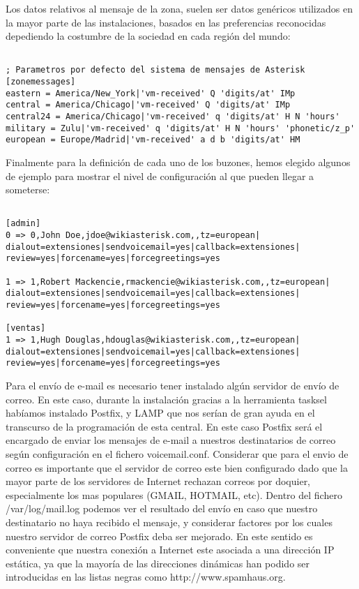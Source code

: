 Los datos relativos al mensaje de la zona, suelen ser datos genéricos utilizados en la mayor parte de las instalaciones, basados en las preferencias reconocidas depediendo la costumbre de la sociedad en cada región del mundo:

\begin{lstlisting}[style=bash,title={/etc/asterisk/voicemail.conf}]

; Parametros por defecto del sistema de mensajes de Asterisk
[zonemessages]
eastern = America/New_York|'vm-received' Q 'digits/at' IMp
central = America/Chicago|'vm-received' Q 'digits/at' IMp
central24 = America/Chicago|'vm-received' q 'digits/at' H N 'hours'
military = Zulu|'vm-received' q 'digits/at' H N 'hours' 'phonetic/z_p'
european = Europe/Madrid|'vm-received' a d b 'digits/at' HM

\end{lstlisting}

Finalmente para la definición de cada uno de los buzones, hemos elegido algunos de ejemplo para mostrar el nivel de configuración al que pueden llegar a someterse:

\begin{lstlisting}[style=bash,title={/etc/asterisk/voicemail.conf}]

[admin]
0 => 0,John Doe,jdoe@wikiasterisk.com,,tz=european|
dialout=extensiones|sendvoicemail=yes|callback=extensiones|
review=yes|forcename=yes|forcegreetings=yes

1 => 1,Robert Mackencie,rmackencie@wikiasterisk.com,,tz=european|
dialout=extensiones|sendvoicemail=yes|callback=extensiones|
review=yes|forcename=yes|forcegreetings=yes

[ventas]
1 => 1,Hugh Douglas,hdouglas@wikiasterisk.com,,tz=european|
dialout=extensiones|sendvoicemail=yes|callback=extensiones|
review=yes|forcename=yes|forcegreetings=yes

\end{lstlisting}

Para el envío de e-mail es necesario tener instalado algún servidor de envío de correo. En este caso, durante la instalación gracias a la herramienta tasksel habíamos instalado Postfix, y LAMP que nos serían de gran ayuda en el transcurso de la programación de esta central. En este caso Postfix será el encargado de enviar los mensajes de e-mail a nuestros destinatarios de correo según configuración en el fichero voicemail.conf. Considerar que para el envio de correo es importante que el servidor de correo este bien configurado dado que la mayor parte de los servidores de Internet rechazan correos por doquier, especialmente los mas populares (GMAIL, HOTMAIL, etc). Dentro del fichero /var/log/mail.log podemos ver el resultado del envío en caso que nuestro destinatario no haya recibido el mensaje, y considerar factores por los cuales nuestro servidor de correo Postfix deba ser mejorado. En este sentido es conveniente que nuestra conexión a Internet este asociada a una dirección IP estática, ya que la mayoría de las direcciones dinámicas han podido ser introducidas en las listas negras como http://www.spamhaus.org.

